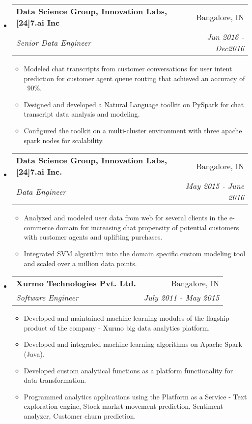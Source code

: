 \documentclass[letterpaper,10pt]{article}
\makeatletter
\newcommand{\resumeBullet}[2]{
  \item\small{
    \textbf{#1}{#2 \vspace{-2pt}}
  }
}
\newcommand{\resumeSubheading}[4]{
  \vspace{-1pt}\item
    \begin{tabular*}{0.97\textwidth}{l@{\extracolsep{\fill}}r}
      \textbf{#1} & #2 \\
      \textit{\small#3} & \textit{\small #4} \\
    \end{tabular*}\vspace{-5pt}
}
\newcommand{\resumeJobFunc}[2]{\resumeBullet{#1}{#2}\vspace{-0pt}}
\newcommand{\resumeSubHeadingListStart}{\begin{itemize}[leftmargin=*]}
\newcommand{\resumeSubHeadingListEnd}{\end{itemize}}
\newcommand{\resumeItemListStart}{\begin{itemize}}
\newcommand{\resumeItemListEnd}{\end{itemize}\vspace{-5pt}}
\makeatother
\begin{document}
\resumeSubHeadingListStart      
    \resumeSubheading
      {Data Science Group, Innovation Labs, [24]7.ai Inc}{Bangalore, IN}
      {Senior Data Engineer}{Jun 2016 - Dec2016}
      \resumeItemListStart      
      \resumeJobFunc{}{Modeled chat transcripts from customer conversations for user intent prediction for customer agent queue routing that achieved an accuracy of ~90\%.}
      \resumeJobFunc{}{Designed and developed a Natural Language toolkit on PySpark for chat transcript data analysis and modeling.}
      \resumeJobFunc{}{Configured the toolkit on a multi-cluster environment with three apache spark nodes for scalability.}
      \resumeItemListEnd      
    \resumeSubHeadingListEnd        
      
\resumeSubHeadingListStart
    \resumeSubheading
      {Data Science Group, Innovation Labs, [24]7.ai Inc.}{Bangalore, IN}
      {Data Engineer}{May 2015 - June 2016}
      \resumeItemListStart            
       \resumeJobFunc{}{Analyzed and modeled user data from web for several clients in the e-commerce domain for increasing chat propensity of potential customers with customer agents and uplifting purchases.}
       \resumeJobFunc{}{Integrated SVM algorithm into the domain specific custom modeling tool and scaled over a million data points.}
      \resumeItemListEnd             
      \resumeSubHeadingListEnd        

\resumeSubHeadingListStart      
    \resumeSubheading
      {Xurmo Technologies Pvt. Ltd.}{Bangalore, IN}
      {Software Engineer}{July 2011 - May 2015}
      \resumeItemListStart            
       \resumeJobFunc{}{Developed and maintained machine learning modules of the flagship product of the company - Xurmo big data analytics platform.}
       \resumeJobFunc{}{Developed and integrated machine learning algorithms on Apache Spark (Java).}
       \resumeJobFunc{}{Developed custom analytical functions as a platform functionality for data transformation.}
       \resumeJobFunc{}{Programmed analytics applications using the Platform as a Service - Text exploration engine, Stock market movement prediction, Sentiment analyzer, Customer churn prediction.}
      \resumeItemListEnd             
      \resumeSubHeadingListEnd        


%


\end{document}
